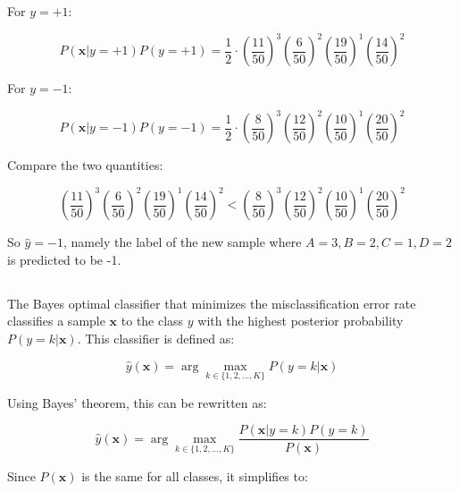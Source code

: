 \documentclass[oneside,solution]{seu-ml-assign}
\begin{document}
For \( y = +1 \):

\begin{equation}
  P(\mathbf{x} | y = +1) P(y = +1) = \frac{1}{2} \cdot \left( \frac{11}{50} \right)^3 \left( \frac{6}{50} \right)^2 \left( \frac{19}{50} \right)^1 \left( \frac{14}{50} \right)^2
\end{equation}

For \( y = -1 \):

\begin{equation}
  P(\mathbf{x} | y = -1) P(y = -1) = \frac{1}{2} \cdot \left( \frac{8}{50} \right)^3 \left( \frac{12}{50} \right)^2 \left( \frac{10}{50} \right)^1 \left( \frac{20}{50} \right)^2
\end{equation}

Compare the two quantities:

\begin{equation}
  \left( \frac{11}{50} \right)^3 \left( \frac{6}{50} \right)^2 \left( \frac{19}{50} \right)^1 \left( \frac{14}{50} \right)^2 < \left( \frac{8}{50} \right)^3 \left( \frac{12}{50} \right)^2 \left( \frac{10}{50} \right)^1 \left( \frac{20}{50} \right)^2
\end{equation}


So $\hat{y} = -1$, namely the label of the new sample where $A=3, B=2, C=1, D=2$ is predicted to be -1.


\subsection{}
The Bayes optimal classifier that minimizes the misclassification error rate classifies a sample \(\mathbf{x}\) to the class \(y\) with the highest posterior probability \(P(y = k | \mathbf{x})\). This classifier is defined as:

\begin{equation}
  \hat{y}(\mathbf{x}) = \arg\max_{k \in \{1, 2, \ldots, K\}} P(y = k | \mathbf{x})
\end{equation}

Using Bayes' theorem, this can be rewritten as:

\begin{equation}
  \hat{y}(\mathbf{x}) = \arg\max_{k \in \{1, 2, \ldots, K\}} \frac{P(\mathbf{x} | y = k) P(y = k)}{P(\mathbf{x})}
\end{equation}

Since \(P(\mathbf{x})\) is the same for all classes, it simplifies to:
\end{document}
